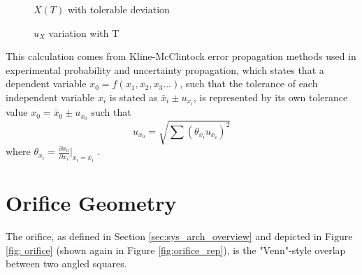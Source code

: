 \documentclass[12pt, letterpaper]{report}%
\begin{document}
\begin{appendices}
\begin{figure}[H]
            \caption{$X(T)$ with tolerable deviation}
            \label{fig:errorpropboundary_X}
        \end{figure}

        \begin{figure}[H]
            \centering
            \caption{$u_X$ variation with T}
            \label{fig:errorpropvariation_X}
        \end{figure}


    This calculation comes from Kline-McClintock error propagation methods used in experimental probability and uncertainty propagation, which states that a dependent variable $x_0 = f(x_1, x_2, x_3...)$,
    such that the tolerance of each independent variable $x_i$ is stated as $\bar{x}_i \pm u_{x_i}$, is represented by its own tolerance value $x_0 = \bar{x}_0 \pm u_{x_0}$ such that
    $$ u_{x_0} = \sqrt{\sum{\left( \theta_{x_i} u_{x_i} \right)^2}} $$
    where $\theta_{x_i} = \frac{\partial x_0}{\partial x_i}\bigg|_{x_i = \overline{x}_i}$ \cite{ref_Figliola}.



\section{Orifice Geometry}
\label{app:orifice_geometry}

    The orifice, as defined in Section \ref{sec:sys_arch_overview} and depicted in Figure \ref{fig: orifice} (shown again in Figure \ref{fig:orifice_rep}), is the "Venn"-style overlap between two angled squares.


\end{appendices}
\end{document}
